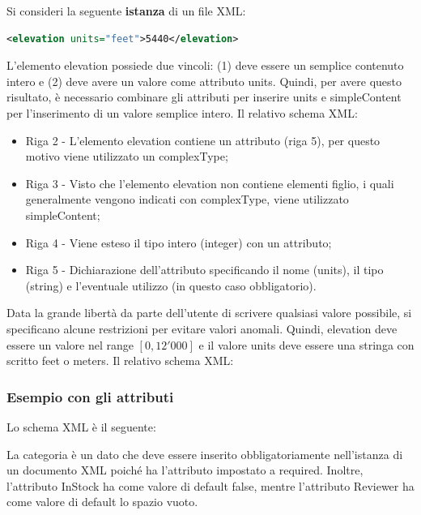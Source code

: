 \documentclass[a4paper]{article}
\begin{document}
	Si consideri la seguente \textbf{istanza} di un file XML:
	\begin{lstlisting}[language=XML]
<elevation units="feet">5440</elevation>\end{lstlisting}
	L'elemento \textsf{elevation} possiede due vincoli: (1) deve essere un semplice contenuto intero e (2) deve avere un valore come attributo \textsf{units}. Quindi, per avere questo risultato, è necessario combinare gli attributi per inserire \textsf{units} e \textsf{simpleContent} per l'inserimento di un valore semplice intero. Il relativo schema XML:
	
	\begin{itemize}
		\item Riga 2 - L'elemento \textsf{elevation} contiene un attributo (riga 5), per questo motivo viene utilizzato un \textsf{complexType};
		
		\item Riga 3 - Visto che l'elemento \textsf{elevation} non contiene elementi figlio, i quali generalmente vengono indicati con \textsf{complexType}, viene utilizzato \textsf{simpleContent};
		
		\item Riga 4 - Viene esteso il tipo intero (\textsf{integer}) con un attributo;
		
		\item Riga 5 - Dichiarazione dell'attributo specificando il nome (\textsf{units}), il tipo (\textsf{string}) e l'eventuale utilizzo (in questo caso obbligatorio).
	\end{itemize}
	Data la grande libertà da parte dell'utente di scrivere qualsiasi valore possibile, si specificano alcune restrizioni per evitare valori anomali. Quindi, \textsf{elevation} deve essere un valore nel range $\left[0, 12'000\right]$ e il valore \textsf{units} deve essere una stringa con scritto \textsf{feet} o \textsf{meters}. Il relativo schema XML:
	


	\subsubsection{Esempio con gli attributi}
	
	Lo schema XML è il seguente:
	
	La categoria è un dato che deve essere inserito obbligatoriamente nell'istanza di un documento XML poiché ha l'attributo impostato a \textsf{required}. Inoltre, l'attributo \textsf{InStock} ha come valore di default \textsf{false}, mentre l'attributo \textsf{Reviewer} ha come valore di default lo spazio vuoto.\newpage
	
\end{document}
